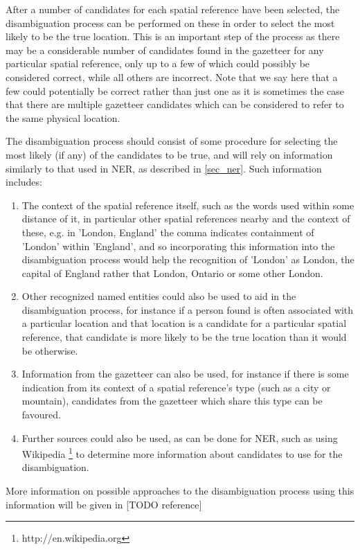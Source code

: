 \documentclass[12pt, a4paper]{report}
\begin{document}
After a number of candidates for each spatial reference have been selected, the disambiguation process can be performed on these in order to select the most likely to be the true location. This is an important step of the process as there may be a considerable number of candidates found in the gazetteer for any particular spatial reference, only up to a few of which could possibly be considered correct, while all others are incorrect. Note that we say here that a few could potentially be correct rather than just one as it is sometimes the case that there are multiple gazetteer candidates which can be considered to refer to the same physical location.

The disambiguation process should consist of some procedure for selecting the most likely (if any) of the candidates to be true, and will rely on information similarly to that used in NER, as described in \ref{sec_ner}. Such information includes:

\begin{enumerate}
	\item { The context of the spatial reference itself, such as the words used within some distance of it, in particular other spatial references nearby and the context of these, e.g. in 'London, England' the comma indicates containment of 'London' within 'England', and so incorporating this information into the disambiguation process would help the recognition of 'London' as London, the capital of England rather that London, Ontario or some other London.  	}
	\item { Other recognized named entities could also be used to aid in the disambiguation process, for instance if a person found is often associated with a particular location and that location is a candidate for a particular spatial reference, that candidate is more likely to be the true location than it would be otherwise.
	} 
	\item { Information from the gazetteer can also be used, for instance if there is some indication from its context of a spatial reference's type (such as a city or mountain), candidates from the gazetteer which share this type can be favoured. 
	} 
	\item { Further sources could also be used, as can be done for NER, such as using Wikipedia \footnote{http://en.wikipedia.org} to determine more information about candidates to use for the disambiguation.
	}

\end{enumerate}

More information on possible approaches to the disambiguation process using this information will be given in [TODO reference]
\end{document}
